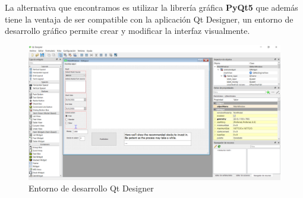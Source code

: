 \documentclass[12pt,a4paper]{article}
\begin{document}
	 La alternativa que encontramos es utilizar la librería gráfica  \textbf{PyQt5} que además tiene la ventaja de ser compatible con la aplicación Qt Designer, un entorno de desarrollo gráfico permite crear y modificar la interfaz visualmente.\\
\begin{figure}[H]
\centering
  \centering
  \includegraphics[width=1\linewidth]{qt designer}
\caption{Entorno de desarrollo Qt Designer}
\label{fig:subrgrafo}
\end{figure}
\end{document}
